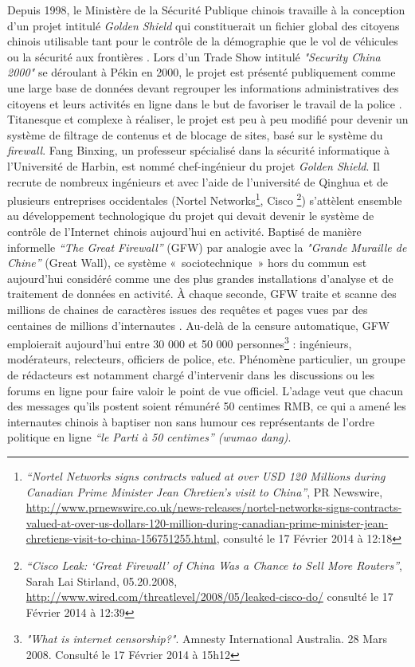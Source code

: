 Depuis 1998, le Ministère de la Sécurité Publique chinois travaille à la conception d’un projet intitulé \textit{Golden Shield} qui constituerait un fichier global des citoyens chinois utilisable tant pour le contrôle de la démographie que le vol de véhicules ou la sécurité aux frontières \citep{Lyons2009}. Lors d’un Trade Show intitulé \textit{"Security China 2000"} se déroulant à Pékin en 2000, le projet est présenté publiquement comme une large base de données devant regrouper les informations administratives des citoyens et leurs activités en ligne dans le but de favoriser le travail de la police \citep{Walton2001}. Titanesque et complexe à réaliser, le projet est peu à peu modifié pour devenir un système de filtrage de contenus et de blocage de sites, basé sur le système du \textit{firewall}. Fang Binxing, un professeur spécialisé dans la sécurité informatique à l’Université de Harbin, est nommé chef-ingénieur du projet \textit{Golden Shield}. Il recrute de nombreux ingénieurs et avec l’aide de l’université de Qinghua et de plusieurs entreprises occidentales (Nortel Networks\footnote{\textit{“Nortel Networks signs contracts valued at over USD 120 Millions during Canadian Prime Minister Jean Chretien’s visit to China”}, PR Newswire, \url{http://www.prnewswire.co.uk/news-releases/nortel-networks-signs-contracts-valued-at-over-us-dollars-120-million-during-canadian-prime-minister-jean-chretiens-visit-to-china-156751255.html}, consulté le 17 Février 2014 à 12:18}, Cisco \footnote{\textit{“Cisco Leak: ‘Great Firewall’ of China Was a Chance to Sell More Routers”}, 
Sarah Lai Stirland, 05.20.2008, \url{http://www.wired.com/threatlevel/2008/05/leaked-cisco-do/} consulté le 17 Février 2014 à 12:39}) s’attèlent ensemble au développement technologique du projet qui devait devenir le système de contrôle de l’Internet chinois aujourd’hui en activité. Baptisé de manière informelle \textit{“The Great Firewall”} (GFW) par analogie avec la \textit{"Grande Muraille de Chine”} (Great Wall), ce système « sociotechnique » hors du commun est aujourd’hui considéré comme une des plus grandes installations d’analyse et de traitement de données en activité. À chaque seconde, GFW traite et scanne des millions de chaines de caractères issues des requêtes et pages vues par des centaines de millions d’internautes \citep{Winter2012}. Au-delà de la censure automatique, GFW emploierait aujourd’hui entre 30 000 et 50 000 personnes\footnote{\textit{"What is internet censorship?"}. Amnesty International Australia. 28 Mars 2008. Consulté le 17 Février 2014 à 15h12} : ingénieurs, modérateurs, relecteurs, officiers de police, etc. Phénomène particulier, un groupe de rédacteurs est notamment chargé d’intervenir dans les discussions ou les forums en ligne pour faire valoir le point de vue officiel. L’adage veut que chacun des messages qu’ils postent soient rémunéré 50 centimes RMB, ce qui a amené les internautes chinois à baptiser non sans humour ces représentants de l’ordre politique en ligne \textit{“le Parti à 50 centimes” (wumao dang)}.

